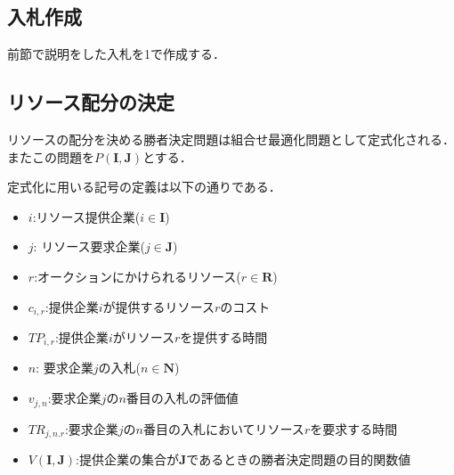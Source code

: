 \hypertarget{ux5165ux672dux4f5cux6210-1}{%
\subsection{入札作成}\label{ux5165ux672dux4f5cux6210-1}}

前節で説明をした入札を1で作成する．

\hypertarget{ux30eaux30bdux30fcux30b9ux914dux5206ux306eux6c7aux5b9a}{%
\subsection{リソース配分の決定}\label{ux30eaux30bdux30fcux30b9ux914dux5206ux306eux6c7aux5b9a}}

リソースの配分を決める勝者決定問題は組合せ最適化問題として定式化される．またこの問題を\(P(\boldsymbol{I},\boldsymbol{J})\)とする．

定式化に用いる記号の定義は以下の通りである．

\begin{itemize}
\tightlist
\item
  \(i\):リソース提供企業(\(i \in \boldsymbol{I}\))
\item
  \(j\): リソース要求企業(\(j \in \boldsymbol{J}\))
\item
  \(r\):オークションにかけられるリソース(\(r \in \boldsymbol{R}\))
\item
  \(c_{i,r}\):提供企業\(i\)が提供するリソース\(r\)のコスト
\item
  \(TP_{i,r}\):提供企業\(i\)がリソース\(r\)を提供する時間
\item
  \(n\): 要求企業\(j\)の入札(\(n \in \boldsymbol{N}\))
\item
  \(v_{j,n}\):要求企業\(j\)の\(n\)番目の入札の評価値
\item
  \(TR_{j,n.r}\):要求企業\(j\)の\(n\)番目の入札においてリソース\(r\)を要求する時間
\item
  \(V(\boldsymbol{I},\boldsymbol{J})\):提供企業の集合が\(\boldsymbol{J}\)であるときの勝者決定問題の目的関数値
\end{itemize}

